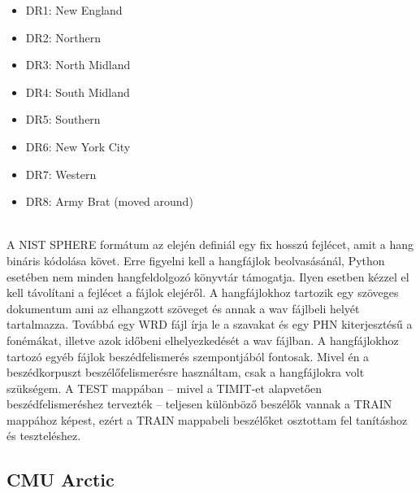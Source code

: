 \begin{multicols}{2}
	\begin{itemize}
		\item DR1:  New England
		\item DR2:  Northern
		\item DR3:  North Midland
		\item DR4:  South Midland
		\item DR5:  Southern
		\item DR6:  New York City
		\item DR7:  Western
		\item DR8:  Army Brat (moved around)
	\end{itemize}
\end{multicols}
\ \\
A NIST SPHERE formátum az elején definiál egy fix hosszú fejlécet, amit a hang bináris kódolása követ. Erre figyelni kell a hangfájlok beolvasásánál, Python esetében nem minden hangfeldolgozó könyvtár támogatja. Ilyen esetben kézzel el kell távolítani a fejlécet a fájlok elejéről. A hangfájlokhoz tartozik egy szöveges dokumentum ami az elhangzott szöveget és annak a wav fájlbeli helyét tartalmazza. Továbbá egy WRD fájl írja le a szavakat és egy PHN kiterjesztésű a fonémákat, illetve azok időbeni elhelyezkedését a wav fájlban.
\newline
\newline
A hangfájlokhoz tartozó egyéb fájlok beszédfelismerés szempontjából fontosak. Mivel én a beszédkorpuszt beszélőfelismerésre használtam, csak a hangfájlokra volt szükségem. A TEST mappában -- mivel a TIMIT-et alapvetően beszédfelismeréshez tervezték -- teljesen különböző beszélők vannak a TRAIN mappához képest, ezért a TRAIN mappabeli beszélőket osztottam fel tanításhoz és teszteléshez.

\subsection{CMU Arctic}

